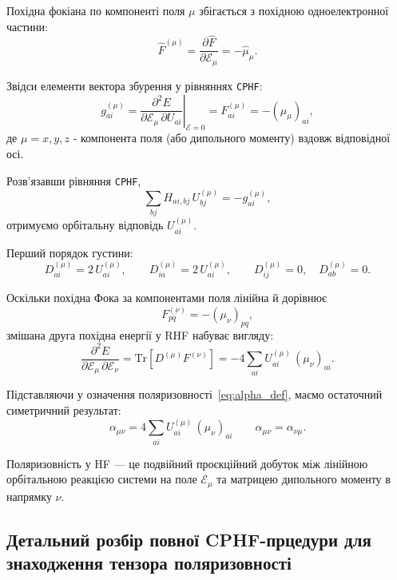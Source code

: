 \documentclass{PySCFBook}
\begin{document}

Похідна фокіана по компоненті поля \(\mu\) збігається з похідною одноелектронної частини:
\[
\hat F^{(\mu)} = \frac{\partial \hat F}{\partial \mathcal E_\mu}
= -\hat\mu_\mu.
\]

Звідси елементи вектора збурення у рівняннях \texttt{CPHF}:
\begin{equation}\label{eq:HF_g_vector_field}
g^{(\mu)}_{ai}
=
\left.\frac{\partial^2 E}{\partial \mathcal E_\mu\,\partial U_{ai}}\right|_{\mathcal E=0}
=
F^{(\mu)}_{ai}
=
-(\mu_{\mu})_{ai},
\end{equation}
де \(\mu = x,y,z\) - компонента поля (або дипольного моменту) вздовж відповідної осі.

Розв’язавши рівняння \texttt{CPHF},
\[
\sum_{bj} H_{ai,bj}\,U^{(\mu)}_{bj} = -g^{(\mu)}_{ai},
\]
отримуємо орбітальну відповідь \(U^{(\mu)}_{ai}\).


Перший порядок густини:
\[
D^{(\mu)}_{ai} = 2\,U^{(\mu)}_{ai},
\qquad
D^{(\mu)}_{ia} = 2\,U^{(\mu)}_{ai},
\qquad
D^{(\mu)}_{ij}=0,\quad
D^{(\mu)}_{ab}=0.
\]

Оскільки похідна Фока за компонентами поля лінійна й дорівнює
\[
F^{(\nu)}_{pq} = -(\mu_{\nu})_{pq},
\]
змішана друга похідна енергії у RHF набуває вигляду:
\begin{equation}\label{eq:HF_mixed_second_derivative}
\frac{\partial^2 E}{\partial \mathcal E_\mu\,\partial \mathcal E_\nu}
=
\mathrm{Tr}\!\left[D^{(\mu)} F^{(\nu)}\right]
=
-4 \sum_{ai}
U^{(\mu)}_{ai}\,(\mu_{\nu})_{ai}.
\end{equation}

Підставляючи у означення поляризовності~\eqref{eq:alpha_def},
маємо остаточний симетричний результат:
\begin{equation}\label{eq:HF_polarizability_final_sym}
\alpha_{\mu\nu}
=
4 \sum_{ai}
U^{(\mu)}_{ai}\,(\mu_{\nu})_{ai}
\qquad
\alpha_{\mu\nu}=\alpha_{\nu\mu}.
\end{equation}

Поляризовність у HF --- це подвійний проєкційний добуток між лінійною
орбітальною реакцією системи на поле \(\mathcal E_\mu\)
та матрицею дипольного моменту в напрямку \(\nu\).


\subsection{Детальний розбір повної CPHF-прцедури для знаходження тензора поляризовності}
\end{document}
